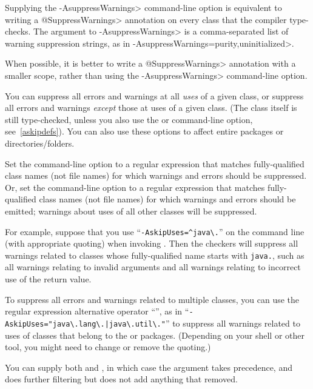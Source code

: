 
Supplying the \<-AsuppressWarnings> command-line option is equivalent to
writing a \<@SuppressWarnings> annotation on every class that the compiler
type-checks.  The argument to \<-AsuppressWarnings> is a comma-separated
list of warning suppression strings, as in
\<-AsuppressWarnings=purity,uninitialized>.

When possible, it is better to write a \<@SuppressWarnings> annotation with a
smaller scope, rather than using the \<-AsuppressWarnings> command-line option.



You can suppress all errors and warnings at all \emph{uses} of a given
class, or suppress all errors and warnings \emph{except} those at uses of a given
class.  (The class itself is still type-checked, unless you also use
the  or  command-line option, see~\ref{askipdefs}).
You can also use these options to affect entire packages or directories/folders.

Set the  command-line option to a
regular expression that matches fully-qualified class names (not file names) for which warnings and errors
should be suppressed.
Or, set the  command-line option to a
regular expression that matches fully-qualified class names (not file names) for which warnings and errors
should be emitted; warnings about uses of all other classes will be suppressed.

For example, suppose that you use
``{\codesize\verb|-AskipUses=^java\.|}'' on the command line
(with appropriate quoting) when invoking
.  Then the checkers will suppress all warnings related to
classes whose fully-qualified name starts with \codesize\verb|java.|, such
as all warnings relating to invalid arguments and all warnings relating to
incorrect use of the return value.

To suppress all errors and warnings related to multiple classes, you can use
the regular expression alternative operator ``\code{|}'', as in
``{\codesize\verb+-AskipUses="java\.lang\.|java\.util\."+}'' to suppress
all warnings related to uses of classes that belong to the  or
 packages.  (Depending on your shell or other tool, you
might need to change or remove the quoting.)

You can supply both  and , in which case
the  argument takes precedence, and  does
further filtering but does not add anything that  removed.

